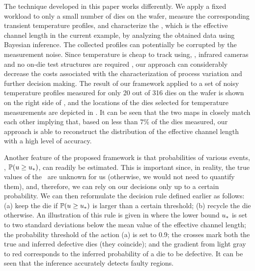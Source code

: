 The technique developed in this paper works differently. We apply a fixed workload to only a small number of dies on the wafer, measure the corresponding transient temperature profiles, and characterize the \qoi, which is the effective channel length in the current example, by analyzing the obtained data using Bayesian inference.
The collected profiles can potentially be corrupted by the measurement noise. Since temperature is cheap to track using, \eg, infrared cameras and no on-die test structures are required \cite{mesa-martinez2007}, our approach can considerably decrease the costs associated with the characterization of process variation and further decision making.
The result of our framework applied to a set of noisy temperature profiles measured for only 20 out of 316 dies on the wafer is shown on the right side of , and the locations of the dies selected for temperature measurements are depicted in .
It can be seen that the two maps in  closely match each other implying that, based on less than $7\%$ of the dies measured, our approach is able to reconstruct the distribution of the effective channel length with a high level of accuracy.

Another feature of the proposed framework is that probabilities of various events, \eg, $\mathbb{P}(u \geq u_*)$, can readily be estimated.
This is important since, in reality, the true values of the \qoi\ are unknown for us (otherwise, we would not need to quantify them), and, therefore, we can rely on our decisions only up to a certain probability.
We can then reformulate the decision rule defined earlier as follows: (a) keep the die if $\mathbb{P}(u \geq u_*)$ is larger than a certain threshold; (b) recycle the die otherwise.
An illustration of this rule is given in  where the lower bound $u_*$ is set to two standard deviations below the mean value of the effective channel length; the probability threshold of the action (a) is set to 0.9; the crosses mark both the true and inferred defective dies (they coincide); and the gradient from light gray to red corresponds to the inferred probability of a die to be defective. It can be seen that the inference accurately detects faulty regions.



